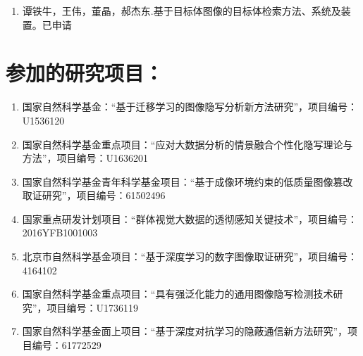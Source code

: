 \begin{enumerate}
	\item 谭铁牛，王伟，董晶，郝杰东.基于目标体图像的目标体检索方法、系统及装置。已申请
\end{enumerate}

\section*{参加的研究项目：}

\begin{enumerate}
	\item 国家自然科学基金：“基于迁移学习的图像隐写分析新方法研究”，项目编号：U1536120

	\item 国家自然科学基金重点项目：“应对大数据分析的情景融合个性化隐写理论与方法”，项目编号：U1636201

	\item 国家自然科学基金青年科学基金项目：“基于成像环境约束的低质量图像篡改取证研究”，项目编号：61502496

	\item 国家重点研发计划项目：“群体视觉大数据的透彻感知关键技术”，项目编号：2016YFB1001003

	\item 北京市自然科学基金项目：“基于深度学习的数字图像取证研究”，项目编号：4164102

	\item 国家自然科学基金重点项目：“具有强泛化能力的通用图像隐写检测技术研究”，项目编号：U1736119

	\item 国家自然科学基金面上项目：“基于深度对抗学习的隐蔽通信新方法研究”，项目编号：61772529

\end{enumerate}

